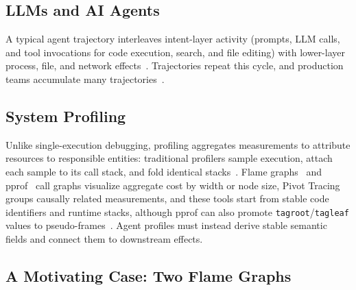 \documentclass[letterpaper]{article}
\begin{document}
\subsection{LLMs and AI Agents}

A typical agent trajectory interleaves intent-layer activity (prompts, LLM
calls, and tool invocations for code execution, search, and file editing) with
lower-layer process, file, and network
effects~\cite{sweagent,codex,claudecode,agentsight}.
Trajectories repeat this cycle, and production teams accumulate many
trajectories~\cite{agentsight}.

\subsection{System Profiling}

Unlike single-execution debugging, profiling aggregates measurements to
attribute resources to responsible entities: traditional profilers sample
execution, attach each sample to its call stack, and fold identical
stacks~\cite{pprof,flamegraphs}.
Flame graphs~\cite{flamegraphs} and pprof~\cite{pprof} call graphs visualize
aggregate cost by width or node size, Pivot Tracing~\cite{pivottracing} groups
causally related measurements, and these tools start from stable code
identifiers and runtime stacks, although pprof can also promote
\texttt{tagroot}/\texttt{tagleaf} values to pseudo-frames~\cite{pprof}.
Agent profiles must instead derive stable semantic fields and connect them to
downstream effects.

\subsection{A Motivating Case: Two Flame Graphs}
\end{document}
